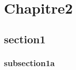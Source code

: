 \documentclass[a4paper,11pt,twoside]{StyleThese}
\begin{document}
\setcounter{chapter}{1} %
\dominitoc
\faketableofcontents
\fi

\chapter{Chapitre2}
\minitoc

\section{section1}
\subsection{subsection1a}

\ifdefined{}
\else


\end{document}
